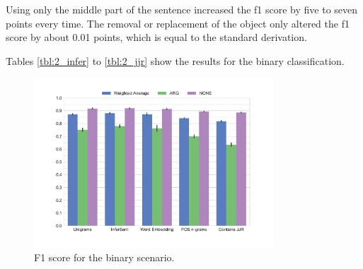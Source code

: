Using only the middle part of the sentence increased the f1 score by five to seven points every time. The removal or replacement of the object only altered the f1 score by about 0.01 points, which is equal to the standard derivation.




Tables \ref{tbl:2_infer} to \ref{tbl:2_jjr} show the results for the binary classification.



\begin{figure}[h]
      \caption{F1 score for the binary scenario.} 
    \label{tbl:3_conf_inf}
 \centering
	\includegraphics[width=0.8\textwidth]{images/experiments/f1-True}

\end{figure}

